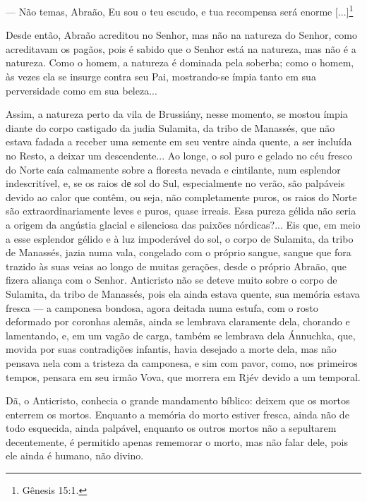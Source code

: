 --- Não temas, Abraão, Eu sou o teu escudo, e tua recompensa será enorme
{[}...{]}\footnote{Gênesis 15:1.}

Desde então, Abraão acreditou no Senhor, mas não na natureza do Senhor,
como acreditavam os pagãos, pois é sabido que o Senhor está na natureza,
mas não é a natureza. Como o homem, a natureza é dominada pela soberba;
como o homem, às vezes ela se insurge contra seu Pai, mostrando-se ímpia
tanto em sua perversidade como em sua beleza...

Assim, a natureza perto da vila de Brussiány, nesse momento, se mostou
ímpia diante do corpo castigado da judia Sulamita, da tribo de Manassés,
que não estava fadada a receber uma semente em seu ventre ainda quente,
a ser incluída no Resto, a deixar um descendente... Ao longe, o sol puro
e gelado no céu fresco do Norte caía calmamente sobre a floresta nevada
e cintilante, num esplendor indescritível, e, se os raios dе sol do Sul,
especialmente no verão, são palpáveis devido ao calor que contêm, ou
seja, não completamente puros, os raios do Norte são extraordinariamente
leves e puros, quase irreais. Essa pureza gélida não seria a origem da
angústia glacial e silenciosa das paixões nórdicas?... Eis que, em meio
a esse esplendor gélido e à luz impoderável do sol, o corpo de Sulamita,
da tribo de Manassés, jazia numa vala, congelado com o próprio sangue,
sangue que fora trazido às suas veias ao longo de muitas gerações, desde
o próprio Abraão, que fizera aliança com o Senhor. Anticristo não se
deteve muito sobre o corpo de Sulamita, da tribo de Manassés, pois ela
ainda estava quente, sua memória estava fresca --- a camponesa bondosa,
agora deitada numa estufa, com o rosto deformado por coronhas alemãs,
ainda se lembrava claramente dela, chorando e lamentando, e, em um vagão
de carga, também se lembrava dela Ánnuchka, que, movida por suas
contradições infantis, havia desejado a morte dela, mas não pensava nela
com a tristeza da camponesa, e sim com pavor, como, nos primeiros
tempos, pensara em seu irmão Vova, que morrera em Rjév devido a um
temporal.

Dã, o Anticristo, conhecia o grande mandamento bíblico: deixem que os
mortos enterrem os mortos. Enquanto a memória do morto estiver fresca,
ainda não de todo esquecida, ainda palpável, enquanto os outros mortos
não a sepultarem decentemente, é permitido apenas rememorar o morto, mas
não falar dele, pois ele ainda é humano, não divino.

